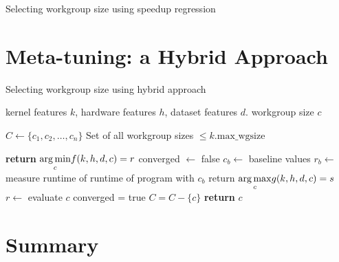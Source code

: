 \begin{algorithm}

\caption{Selecting workgroup size using speedup regression}
\label{alg:autotune-speedup-regression}
\end{algorithm}


\section{Meta-tuning: a Hybrid Approach}

\begin{algorithm}
\caption{Selecting workgroup size using hybrid approach}
\label{alg:autotune-hybrid}
\begin{algorithmic}[1]
\Require kernel features $k$, hardware features $h$, dataset features $d$.
\Ensure workgroup size $c$

\State $C \leftarrow \{ c_1, c_2,\ldots, c_n \}$
\Comment Set of all workgroup sizes $\le k.\text{max\_wgsize}$

    \State \textbf{return} $\underset{c}{\operatorname*{arg\,min}} f(k,h,d,c) = r$
\Else
   \State converged $\leftarrow$ false
   \State $c_b \leftarrow$ baseline values
   \State $r_b \leftarrow$ measure runtime of runtime of program with $c_b$
     \State return $\underset{c}{\operatorname*{arg\,max}} g(k,h,d,c) = s$
     \State $r \leftarrow$ evaluate $c$
       \State converged = true
     \Else
       \State $C = C - \{c\}$
     \EndIf
   \EndWhile
   \State \textbf{return} $c$
\EndIf
\end{algorithmic}
\end{algorithm}

\section{Summary}
